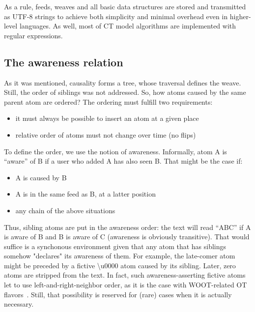 \documentclass[twocolumn]{article}
\begin{document}
   As a rule, feeds, weaves and all basic data structures are stored
   and transmitted as UTF-8 strings to achieve both simplicity and
   minimal overhead even in higher-level languages. As well, most of
   CT model algorithms are implemented with regular expressions.

\subsection {The awareness relation}

   As it was mentioned, causality forms a tree, whose traversal
   defines the weave. Still, the order of siblings was not addressed.
   So, how atoms caused by the same parent atom are ordered? The
   ordering must fulfill two requirements:
   \begin{itemize}
     \item it must always be possible to insert an atom at a given place
     \item relative order of atoms must not change over time (no flips)
   \end{itemize}
   To define the order, we use the notion of awareness. 
   Informally, atom A is ``aware'' of B if a user who added A has
   also seen B. That might be the case if:
   \begin{itemize}
     \item A is caused by B
     \item A is in the same feed as B, at a latter position
     \item any chain of the above situations
   \end{itemize}
   Thus,
   sibling atoms are put in the awareness order: the text will read
   ``ABC'' if A is aware of
   B and B is aware of C (awareness is obviously transitive). 
   That would suffice
   is a synchonous environment given that any atom that has siblings
   somehow "declares" its awareness of them. For example,
   the late-comer atom might be preceded by a fictive
   {\textbackslash}u0000 atom caused by its sibling.
   Later, zero atoms are stripped from the text.
   In fact, such awareness-asserting fictive atoms let to use
   left-and-right-neighbor order, as it is the case with WOOT-related
   OT flavors~\cite{woot}. Still, that possibility is reserved for
   (rare) cases when it is actually necessary.
   
\end{document}
